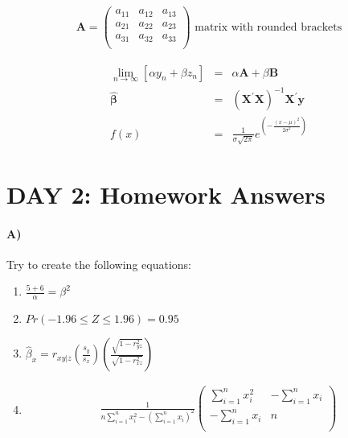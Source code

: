 \documentclass[10pt]{article}
\begin{document}
\begin{eqnarray*}
\textbf{A} = 
\begin{pmatrix}
a_{11} & a_{12} & a_{13} \\
a_{21} & a_{22} & a_{23} \\
a_{31} & a_{32} & a_{33} \\
\end{pmatrix}\mbox{ matrix with rounded brackets}
\end{eqnarray*}

\begin{eqnarray*}
\lim_{n \to \infty} [\alpha y_n + \beta z_n] &=& \alpha \textbf{A} + \beta \textbf{B} \\
\boldsymbol{\hat{\beta}} &=& (\mathbf{X^\prime X})^{-1} \mathbf{X^\prime y} \\
f(x) &=& \frac{1}{\sigma \sqrt{2 \pi}} e^{\left( - \frac{(x -
   \mu)^2}{2 \sigma^2} \right)}
\end{eqnarray*}

\section*{DAY 2: Homework Answers}
\paragraph{A)} Try to create the following equations:

\begin{enumerate}
\item $\frac{5 + 6}{\alpha} = \beta^2$
\item $Pr(-1.96 \leq Z \leq 1.96) = 0.95$
\item $\hat{\beta}_x = r_{xy|z} \left(\frac{s_y}{s_x} \right) \left(\frac{\sqrt{1-r^2_{yz}}}{\sqrt{1-r^2_{xz}}} \right)$
\item 
\begin{eqnarray*}
\frac{1}{n \sum_{i=1}^{n} x_i^2 - \left(\sum_{i=1}^{n} x_i \right)^2}
\begin{pmatrix}
\sum_{i=1}^{n} x_i^2 & -\sum_{i=1}^{n} x_i\\
-\sum_{i=1}^{n} x_i & n\\
\end{pmatrix} \\
\end{eqnarray*}
\end{enumerate}
\end{document}
